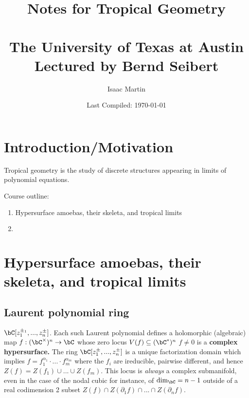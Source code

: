 
\usepackage{indentfirst}

\title{Notes for Tropical Geometry\\ \vspace{0.5em}{\Large Fall 2022}\vspace{0.5em}\\ The University of Texas at Austin \\ Lectured by Bernd Seibert}
\date{Last Compiled: \today}
\author{Isaac Martin}


\pagestyle{empty}
\maketitle
\newpage
\tableofcontents
\newpage
{}

\setcounter{section}{-1}
\section{Introduction/Motivation} Tropical geometry is the study of discrete structures appearing in limits of polynomial equations.

Course outline:
\begin{enumerate}[(1)]
  \item Hypersurface amoebas, their skeleta, and tropical limits
  \item 
\end{enumerate}

\section{Hypersurface amoebas, their skeleta, and tropical limits}
\subsection{Laurent polynomial ring}

$\bC[z^{\pm_1}_1,...,z_n^{\pm}]$. Each such Laurent polynomial defines a holomorphic (algebraic) map $f:(\bC^\times)^n \to \bC$ whose zero locus $V(f) \subseteq (\bC^*)^n$ $f \neq 0$ is a \textbf{complex hypersurface.} The ring $\bC[z_1^{\pm},...,z_n^{\pm}]$ is a unique factorization domain which implies $f = f_1^{\alpha_1}\cdot...\cdot f_m^{\alpha_m}$ where the $f_i$ are ireducible, pairwise different, and hence $Z(f) = Z(f_1) \cup ... \cup Z(f_m)$. This locus is \emph{always} a complex submanifold, even in the case of the nodal cubic for instance, of $\dim_\bC = n - 1$ outside of a real codimension 2 subset $Z(f) \cap Z(\partial_1 f) \cap ... \cap Z(\partial_n f)$.


